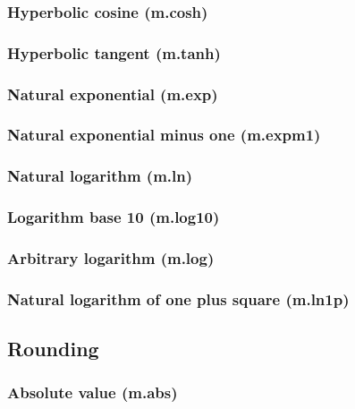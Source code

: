 \documentclass{article}
\theoremstyle{definition}
\begin{document}
\subsubsection{Hyperbolic cosine (m.cosh)}

\subsubsection{Hyperbolic tangent (m.tanh)}

\subsubsection{Natural exponential (m.exp)}

\subsubsection{Natural exponential minus one (m.expm1)}

\subsubsection{Natural logarithm (m.ln)}

\subsubsection{Logarithm base 10 (m.log10)}

\subsubsection{Arbitrary logarithm (m.log)}

\subsubsection{Natural logarithm of one plus square (m.ln1p)}

\subsection{Rounding}

\subsubsection{Absolute value (m.abs)}
\end{document}
